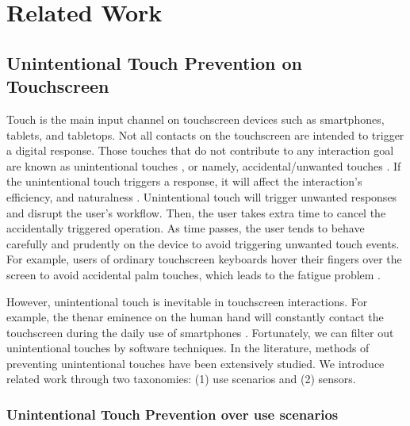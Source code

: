 \section{Related Work}

\subsection{Unintentional Touch Prevention on Touchscreen}

Touch is the main input channel on touchscreen devices such as smartphones, tablets, and tabletops. Not all contacts on the touchscreen are intended to trigger a digital response. Those touches that do not contribute to any interaction goal are known as unintentional touches \cite{2020-TabletopTouch}, or namely, accidental/unwanted touches \cite{2015-GestureOn,2012-IdentifyUnint}. If the unintentional touch triggers a response, it will affect the interaction's efficiency, and naturalness \cite{2014-PenMightier, 2020-TabletopTouch}. Unintentional touch will trigger unwanted responses and disrupt the user's workflow. Then, the user takes extra time to cancel the accidentally triggered operation. As time passes, the user tends to behave carefully and prudently on the device to avoid triggering unwanted touch events. For example, users of ordinary touchscreen keyboards hover their fingers over the screen to avoid accidental palm touches, which leads to the fatigue problem \cite{2018-UbiK}.


However, unintentional touch is inevitable in touchscreen interactions. For example, the thenar eminence on the human hand will constantly contact the touchscreen during the daily use of smartphones \cite{2018-PalmTouch}. Fortunately, we can filter out unintentional touches by software techniques. In the literature, methods of preventing unintentional touches have been extensively studied. We introduce related work through two taxonomies: (1) use scenarios and (2) sensors.

\subsubsection{Unintentional Touch Prevention over use scenarios}

